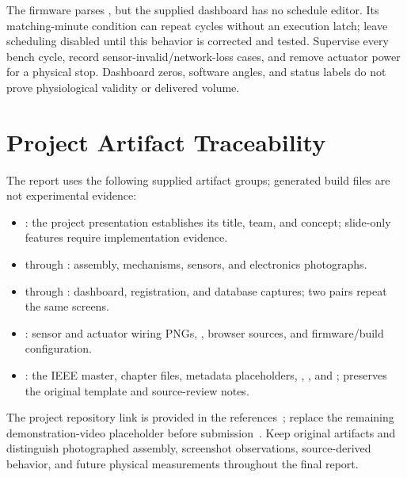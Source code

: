 The firmware parses , but the supplied dashboard has no schedule editor. Its matching-minute condition can repeat cycles without an execution latch; leave scheduling disabled until this behavior is corrected and tested. Supervise every bench cycle, record sensor-invalid/network-loss cases, and remove actuator power for a physical stop. Dashboard zeros, software angles, and status labels do not prove physiological validity or delivered volume.

\newpage
\section{Project Artifact Traceability}
\label{app:artifact-traceability}

The report uses the following supplied artifact groups; generated build files are not experimental evidence:
\begin{itemize}
\item {}: the project presentation establishes its title, team, and concept; slide-only features require implementation evidence.
\item {} through : assembly, mechanisms, sensors, and electronics photographs.
\item {} through : dashboard, registration, and database captures; two pairs repeat the same screens.
\item {}: sensor and actuator wiring PNGs, ,  browser sources, and  firmware/build configuration.
\item {}: the IEEE master, chapter files, metadata placeholders, , , and ;  preserves the original template and source-review notes.
\end{itemize}
The project repository link is provided in the references~\cite{projectgithub}; replace the remaining demonstration-video placeholder before submission~\cite{projectyoutube}. Keep original artifacts and distinguish photographed assembly, screenshot observations, source-derived behavior, and future physical measurements throughout the final report.
